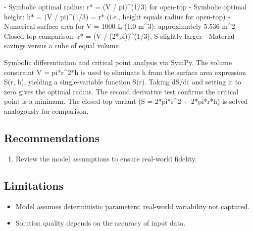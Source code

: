 \documentclass[11pt, a4paper]{article}
\begin{document}
- Symbolic optimal radius: r* = (V / pi)\textasciicircum{}(1/3) for open-top
- Symbolic optimal height: h* = (V / pi)\textasciicircum{}(1/3) = r* (i.e., height equals radius for open-top)
- Numerical surface area for V = 1000 L (1.0 m\textasciicircum{}3): approximately 5.536 m\textasciicircum{}2
- Closed-top comparison: r* = (V / (2*pi))\textasciicircum{}(1/3), S slightly larger
- Material savings versus a cube of equal volume

Symbolic differentiation and critical point analysis via SymPy. The volume constraint V = pi*r\textasciicircum{}2*h is used to eliminate h from the surface area expression S(r, h), yielding a single-variable function S(r). Taking dS/dr and setting it to zero gives the optimal radius. The second derivative test confirms the critical point is a minimum. The closed-top variant (S = 2*pi*r\textasciicircum{}2 + 2*pi*r*h) is solved analogously for comparison.



\subsection{Recommendations}

\begin{enumerate}
  \item Review the model assumptions to ensure real-world fidelity.
\end{enumerate}

\subsection{Limitations}

\begin{polyawarnbox}
\begin{itemize}
  \item Model assumes deterministic parameters; real-world variability not captured.
  \item Solution quality depends on the accuracy of input data.
\end{itemize}
\end{polyawarnbox}

\end{document}
